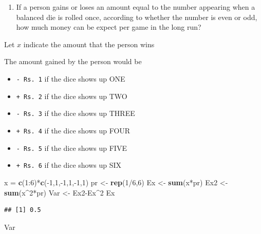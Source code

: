 \documentclass[]{article}
\def\tightlist{}
\newenvironment{Shaded}{\begin{snugshade}}{\end{snugshade}}
\newcommand{\KeywordTok}[1]{\textcolor[rgb]{0.13,0.29,0.53}{\textbf{{#1}}}}
\newcommand{\DecValTok}[1]{\textcolor[rgb]{0.00,0.00,0.81}{{#1}}}
\newcommand{\StringTok}[1]{\textcolor[rgb]{0.31,0.60,0.02}{{#1}}}
\newcommand{\NormalTok}[1]{{#1}}
\numberwithin{equation}{section}
\begin{document}
\begin{enumerate}
\def\labelenumi{\arabic{enumi}.}
\setcounter{enumi}{1}
\tightlist
\item
  If a person gains or loses an amount equal to the number appearing
  when a balanced die is rolled once, according to whether the number is
  even or odd, how much money can be expect per game in the long run?
\end{enumerate}

Let \(x\) indicate the amount that the person wins

The amount gained by the person would be

\begin{itemize}
\tightlist
\item
  \texttt{-\ Rs.\ 1} if the dice shows up ONE
\item
  \texttt{+\ Rs.\ 2} if the dice shows up TWO
\item
  \texttt{-\ Rs.\ 3} if the dice shows up THREE
\item
  \texttt{+\ Rs.\ 4} if the dice shows up FOUR
\item
  \texttt{-\ Rs.\ 5} if the dice shows up FIVE
\item
  \texttt{+\ Rs.\ 6} if the dice shows up SIX
\end{itemize}

\begin{Shaded}
\begin{Highlighting}[]
\NormalTok{x =}\StringTok{ }\KeywordTok{c}\NormalTok{(}\DecValTok{1}\NormalTok{:}\DecValTok{6}\NormalTok{)*}\KeywordTok{c}\NormalTok{(-}\DecValTok{1}\NormalTok{,}\DecValTok{1}\NormalTok{,-}\DecValTok{1}\NormalTok{,}\DecValTok{1}\NormalTok{,-}\DecValTok{1}\NormalTok{,}\DecValTok{1}\NormalTok{)}
\NormalTok{pr <-}\StringTok{ }\KeywordTok{rep}\NormalTok{(}\DecValTok{1}\NormalTok{/}\DecValTok{6}\NormalTok{,}\DecValTok{6}\NormalTok{)}
 \NormalTok{Ex <-}\StringTok{ }\KeywordTok{sum}\NormalTok{(x*pr)}
\NormalTok{Ex2 <-}\StringTok{ }\KeywordTok{sum}\NormalTok{(x^}\DecValTok{2}\NormalTok{*pr)}
\NormalTok{Var <-}\StringTok{ }\NormalTok{Ex2-Ex^}\DecValTok{2}
\NormalTok{Ex}
\end{Highlighting}
\end{Shaded}

\begin{verbatim}
## [1] 0.5
\end{verbatim}

\begin{Shaded}
\begin{Highlighting}[]
\NormalTok{Var}
\end{Highlighting}
\end{Shaded}
\end{document}
